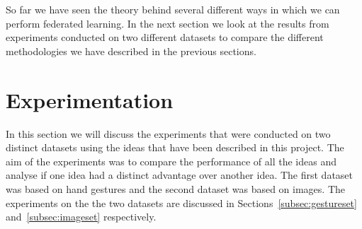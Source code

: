 \documentclass[12pt]{article}
\begin{document}
\\\\
So far we have seen the theory behind several different ways in which we can perform federated learning. In the next section we look at the results from experiments conducted on two different datasets to compare the different methodologies we have described in the previous sections.
\clearpage

\section{Experimentation}\label{sec:experiments}
In this section we will discuss the experiments that were conducted on two distinct datasets using the ideas that have been described in this project. The aim of the experiments was to compare the performance of all the ideas and analyse if one idea had a distinct advantage over another idea. The first dataset was based on hand gestures and the second dataset was based on images. The experiments on the the two datasets are discussed in Sections~\ref{subsec:gestureset} and~\ref{subsec:imageset} respectively.
\end{document}

